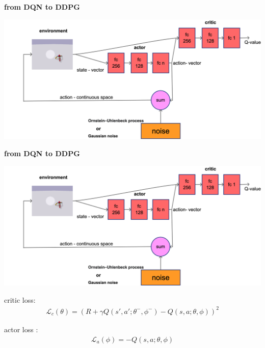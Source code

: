 \documentclass[xcolor=dvipsnames]{beamer}
\begin{document}
\begin{frame}{\bf from DQN to DDPG}

  {\centering \includegraphics[scale=0.16]{../diagrams/ddpgdetail.png}}
\end{frame}

\begin{frame}{\bf from DQN to DDPG}

  {\centering \includegraphics[scale=0.16]{../diagrams/ddpgdetail.png}}

    critic loss:
    \begin{align*}
      \mathcal{L}_c(\theta) = \left( R + \gamma Q(s', a'; \theta^-, \phi^- ) - Q(s, a; \theta, \phi )  \right)^2
    \end{align*}

    actor loss :
    \begin{align*}
      \mathcal{L}_a(\phi) = -Q(s, a; \theta, \phi)
    \end{align*}
\end{frame}
\end{document}
